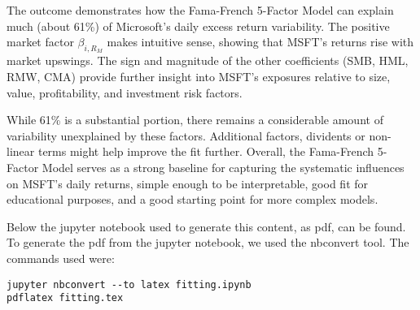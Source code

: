 \documentclass{article}
\begin{document}
The outcome demonstrates how the Fama-French 5-Factor Model
can explain much (about 61\%) of Microsoft's
daily excess return variability.
The positive market factor $\beta_{i,R_M}$ makes intuitive sense,
showing that MSFT's returns rise with market upswings.
The sign and magnitude of the other coefficients (SMB, HML, RMW, CMA) provide further insight
into MSFT's exposures relative to
size, value, profitability, and investment risk factors.

While 61\% is a substantial portion,
there remains a considerable amount of variability
unexplained by these factors.
Additional factors, dividents or non-linear terms might help improve the fit further.
Overall, the Fama-French 5-Factor Model serves as
a strong baseline for capturing the systematic influences on MSFT's daily returns,
simple enough to be interpretable, good fit for educational purposes,
and a good starting point for more complex models.

Below the jupyter notebook used to generate this content, as pdf, can be found.
To generate the pdf from the jupyter notebook, we used the nbconvert tool.
The commands used were:
\begin{verbatim}
jupyter nbconvert --to latex fitting.ipynb
pdflatex fitting.tex
\end{verbatim}
\clearpage

\end{document}
